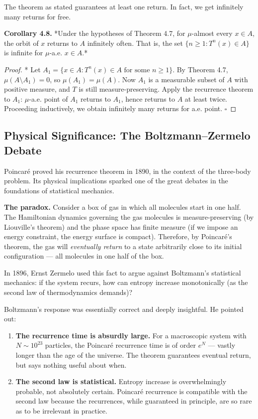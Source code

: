 The theorem as stated guarantees at least one return. In fact, we get infinitely many returns for free.

\textbf{Corollary 4.8.} *Under the hypotheses of Theorem 4.7, for $\mu$-almost every $x \in A$, the orbit of $x$ returns to $A$ infinitely often. That is, the set $\{n \geq 1 : T^n(x) \in A\}$ is infinite for $\mu$-a.e. $x \in A$.*

\begin{proof}
* Let $A_1 = \{x \in A : T^n(x) \in A \text{ for some } n \geq 1\}$. By Theorem 4.7, $\mu(A \setminus A_1) = 0$, so $\mu(A_1) = \mu(A)$. Now $A_1$ is a measurable subset of $A$ with positive measure, and $T$ is still measure-preserving. Apply the recurrence theorem to $A_1$: $\mu$-a.e. point of $A_1$ returns to $A_1$, hence returns to $A$ at least twice. Proceeding inductively, we obtain infinitely many returns for a.e. point. $\square$

\end{proof}

\subsection{Physical Significance: The Boltzmann–Zermelo Debate}\label{sec:4.4.4}

Poincaré proved his recurrence theorem in 1890, in the context of the three-body problem. Its physical implications sparked one of the great debates in the foundations of statistical mechanics.

\textbf{The paradox.} Consider a box of gas in which all molecules start in one half. The Hamiltonian dynamics governing the gas molecules is measure-preserving (by Liouville's theorem) and the phase space has finite measure (if we impose an energy constraint, the energy surface is compact). Therefore, by Poincaré's theorem, the gas will \textit{eventually return} to a state arbitrarily close to its initial configuration --- all molecules in one half of the box.

In 1896, Ernst Zermelo used this fact to argue against Boltzmann's statistical mechanics: if the system recurs, how can entropy increase monotonically (as the second law of thermodynamics demands)?

Boltzmann's response was essentially correct and deeply insightful. He pointed out:

\begin{enumerate}[nosep]
  \item \textbf{The recurrence time is absurdly large.} For a macroscopic system with $N \sim 10^{23}$ particles, the Poincaré recurrence time is of order $e^{N}$ --- vastly longer than the age of the universe. The theorem guarantees eventual return, but says nothing useful about when.

  \item \textbf{The second law is statistical.} Entropy increase is overwhelmingly probable, not absolutely certain. Poincaré recurrence is compatible with the second law because the recurrences, while guaranteed in principle, are so rare as to be irrelevant in practice.
\end{enumerate}

